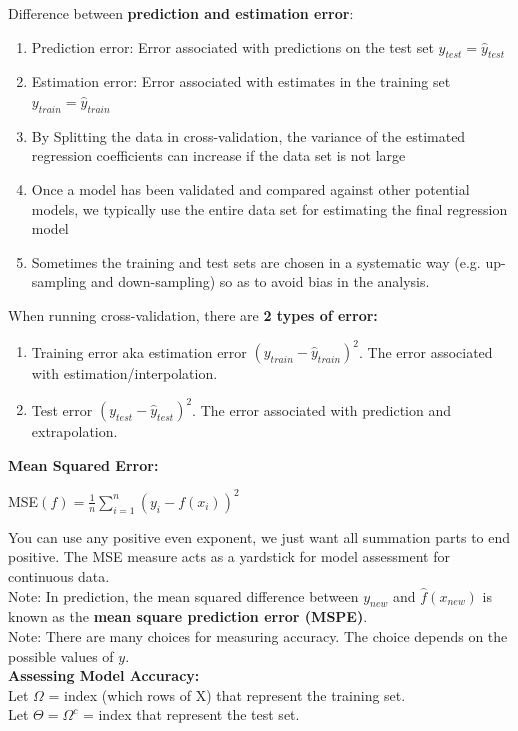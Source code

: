 \documentclass{article}
\begin{document}
Difference between \textbf{prediction and estimation error}:
\begin{enumerate}
    \item Prediction error: Error associated with predictions on the test set $y_{test} = \hat{y}_{test}$
    \item Estimation error: Error associated with estimates in the training set $y_{train} = \hat{y}_{train}$
    \item By Splitting the data in cross-validation, the variance of the estimated regression coefficients can increase if the data set is not large
    \item Once a model has been validated and compared against other potential models, we typically use the entire data set for estimating the final regression model
    \item Sometimes the training and test sets are chosen in a systematic way (e.g. up-sampling and down-sampling) so as to avoid bias in the analysis.
\end{enumerate}
When running cross-validation, there are \textbf{2 types of error:}
\begin{enumerate}
    \item Training error aka estimation error $(y_{train} - \hat{y}_{train})^2$. The error associated with estimation/interpolation.
    \item Test error $(y_{test} - \hat{y}_{test})^2$. The error associated with prediction and extrapolation.
\end{enumerate}
\textbf{Mean Squared Error:}\\
\begin{center}
    MSE$(f) = \frac{1}{n}\sum^{n}_{i = 1}(y_{i} - f(x_{i}))^2$\\
\end{center} You can use any positive even exponent, we just want all summation parts to end positive. The MSE measure acts as a yardstick for model assessment for continuous data.\\
Note: In prediction, the mean squared difference between $y_{new}$ and $\hat{f}(x_{new})$ is known as the \textbf{mean square prediction error (MSPE)}.\\
Note: There are many choices for measuring accuracy. The choice depends on the possible values of $y$.\\
\textbf{Assessing Model Accuracy:}\\
Let $\Omega$ = index (which rows of X) that represent the training set.\\
Let $\Theta = \Omega^{c}$ = index that represent the test set.\\
\end{document}
